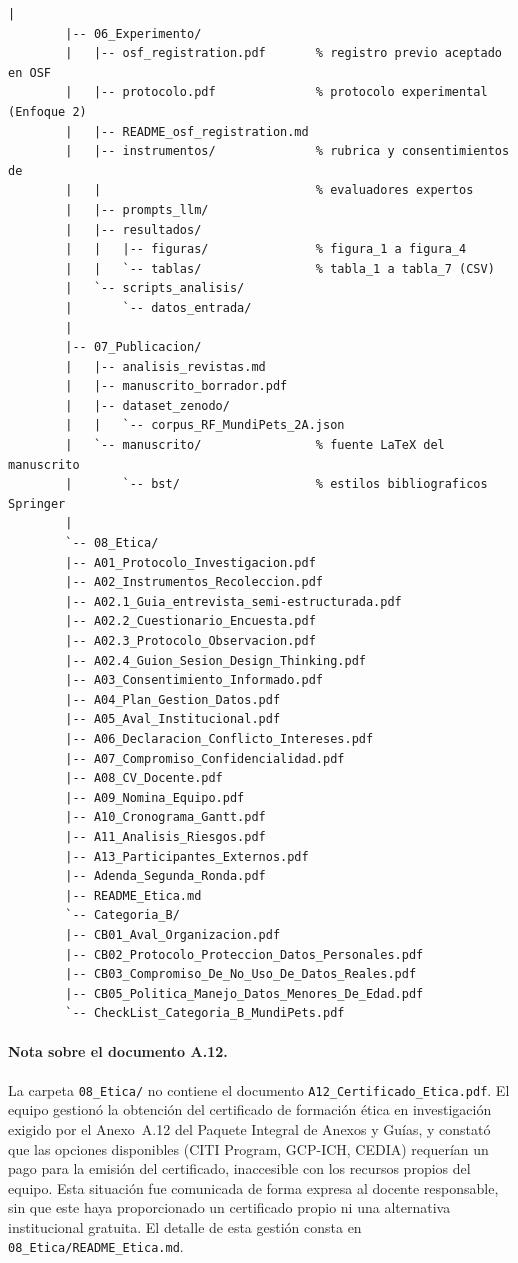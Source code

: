 \documentclass[journal,onecolumn]{IEEEtran}
\begin{document}
\begin{lstlisting}[style=csharp,caption={Estructura de carpetas del repositorio MundiPets-PFC-IngReq (árbol real al corte de la Entrega 3, 2A).},label={lst:estructura_repo}]
		|
		|-- 06_Experimento/
		|   |-- osf_registration.pdf       % registro previo aceptado en OSF
		|   |-- protocolo.pdf              % protocolo experimental (Enfoque 2)
		|   |-- README_osf_registration.md
		|   |-- instrumentos/              % rubrica y consentimientos de
		|   |                              % evaluadores expertos
		|   |-- prompts_llm/
		|   |-- resultados/
		|   |   |-- figuras/               % figura_1 a figura_4
		|   |   `-- tablas/                % tabla_1 a tabla_7 (CSV)
		|   `-- scripts_analisis/
		|       `-- datos_entrada/
		|
		|-- 07_Publicacion/
		|   |-- analisis_revistas.md
		|   |-- manuscrito_borrador.pdf
		|   |-- dataset_zenodo/
		|   |   `-- corpus_RF_MundiPets_2A.json
		|   `-- manuscrito/                % fuente LaTeX del manuscrito
		|       `-- bst/                   % estilos bibliograficos Springer
		|
		`-- 08_Etica/
		|-- A01_Protocolo_Investigacion.pdf
		|-- A02_Instrumentos_Recoleccion.pdf
		|-- A02.1_Guia_entrevista_semi-estructurada.pdf
		|-- A02.2_Cuestionario_Encuesta.pdf
		|-- A02.3_Protocolo_Observacion.pdf
		|-- A02.4_Guion_Sesion_Design_Thinking.pdf
		|-- A03_Consentimiento_Informado.pdf
		|-- A04_Plan_Gestion_Datos.pdf
		|-- A05_Aval_Institucional.pdf
		|-- A06_Declaracion_Conflicto_Intereses.pdf
		|-- A07_Compromiso_Confidencialidad.pdf
		|-- A08_CV_Docente.pdf
		|-- A09_Nomina_Equipo.pdf
		|-- A10_Cronograma_Gantt.pdf
		|-- A11_Analisis_Riesgos.pdf
		|-- A13_Participantes_Externos.pdf
		|-- Adenda_Segunda_Ronda.pdf
		|-- README_Etica.md
		`-- Categoria_B/
		|-- CB01_Aval_Organizacion.pdf
		|-- CB02_Protocolo_Proteccion_Datos_Personales.pdf
		|-- CB03_Compromiso_De_No_Uso_De_Datos_Reales.pdf
		|-- CB05_Politica_Manejo_Datos_Menores_De_Edad.pdf
		`-- CheckList_Categoria_B_MundiPets.pdf
	\end{lstlisting}
	
	\paragraph{Nota sobre el documento A.12.}
	La carpeta \texttt{08\_Etica/} no contiene el documento
	\texttt{A12\_Certificado\_Etica.pdf}. El equipo gestionó la obtención del
	certificado de formación ética en investigación exigido por el Anexo~A.12
	del Paquete Integral de Anexos y Guías, y constató que las opciones
	disponibles (CITI Program, GCP-ICH, CEDIA) requerían un pago para la
	emisión del certificado, inaccesible con los recursos propios del equipo.
	Esta situación fue comunicada de forma expresa al docente responsable, sin
	que este haya proporcionado un certificado propio ni una alternativa
	institucional gratuita. El detalle de esta gestión consta en
	\texttt{08\_Etica/README\_Etica.md}.
	
\end{document}
